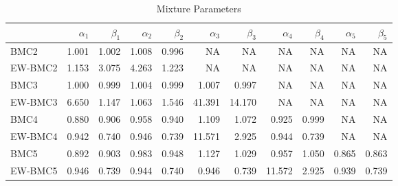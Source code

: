\documentclass[
]{article}
\begin{document}
\begin{table}[H]

\caption{\label{tab:unnamed-chunk-12}Mixture Parameters}
\centering
\fontsize{8}{10}\selectfont
\begin{tabular}[t]{lrrrrrrrrrr}
\toprule
  & $\alpha_1$ & $\beta_1$ & $\alpha_2$ & $\beta_2$ & $\alpha_3$ & $\beta_3$ & $\alpha_4$ & $\beta_4$ & $\alpha_5$ & $\beta_5$\\
\midrule
BMC2 & 1.001 & 1.002 & 1.008 & 0.996 & NA & NA & NA & NA & NA & NA\\
EW-BMC2 & 1.153 & 3.075 & 4.263 & 1.223 & NA & NA & NA & NA & NA & NA\\
BMC3 & 1.000 & 0.999 & 1.004 & 0.999 & 1.007 & 0.997 & NA & NA & NA & NA\\
EW-BMC3 & 6.650 & 1.147 & 1.063 & 1.546 & 41.391 & 14.170 & NA & NA & NA & NA\\
BMC4 & 0.880 & 0.906 & 0.958 & 0.940 & 1.109 & 1.072 & 0.925 & 0.999 & NA & NA\\
\addlinespace
EW-BMC4 & 0.942 & 0.740 & 0.946 & 0.739 & 11.571 & 2.925 & 0.944 & 0.739 & NA & NA\\
BMC5 & 0.892 & 0.903 & 0.983 & 0.948 & 1.127 & 1.029 & 0.957 & 1.050 & 0.865 & 0.863\\
EW-BMC5 & 0.946 & 0.739 & 0.944 & 0.740 & 0.946 & 0.739 & 11.572 & 2.925 & 0.939 & 0.739\\
\bottomrule
\end{tabular}
\end{table}
\end{document}
